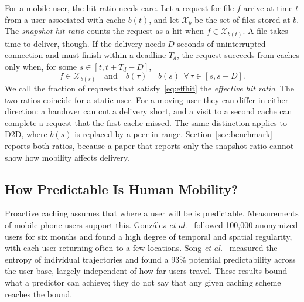 For a mobile user, the hit ratio needs care. Let a request for file $f$ arrive at time $t$ from a user associated with cache $b(t)$, and let $\mathcal{X}_b$ be the set of files stored at $b$. The \emph{snapshot hit ratio} counts the request as a hit when $f\in\mathcal{X}_{b(t)}$. A file takes time to deliver, though. If the delivery needs $D$ seconds of uninterrupted connection and must finish within a deadline $T_d$, the request succeeds from caches only when, for some $s\in[t,t+T_d-D]$,
\begin{equation}
f\in\mathcal{X}_{b(s)} \quad\text{and}\quad b(\tau)=b(s)\ \ \forall\,\tau\in[s,s+D].
\label{eq:effhit}
\end{equation}
We call the fraction of requests that satisfy~\eqref{eq:effhit} the \emph{effective hit ratio}. The two ratios coincide for a static user. For a moving user they can differ in either direction: a handover can cut a delivery short, and a visit to a second cache can complete a request that the first cache missed. The same distinction applies to D2D, where $b(s)$ is replaced by a peer in range. Section~\ref{sec:benchmark} reports both ratios, because a paper that reports only the snapshot ratio cannot show how mobility affects delivery.

\subsection{How Predictable Is Human Mobility?}
\label{subsec:predictability}

Proactive caching assumes that where a user will be is predictable. Measurements of mobile phone users support this. Gonz\'alez \emph{et al.}~\cite{gonzalez2008understanding} followed 100{,}000 anonymized users for six months and found a high degree of temporal and spatial regularity, with each user returning often to a few locations. Song \emph{et al.}~\cite{song2010limits} measured the entropy of individual trajectories and found a 93\% potential predictability across the user base, largely independent of how far users travel. These results bound what a predictor can achieve; they do not say that any given caching scheme reaches the bound.
